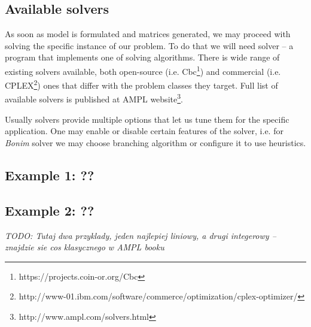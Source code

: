 \subsection{Available solvers}

As soon as model is formulated and matrices generated, we may proceed with solving the specific instance of our problem. To do that we will need solver -- a program that implements one of solving algorithms. There is wide range of existing solvers available, both open-source (i.e. Cbc\footnote{https://projects.coin-or.org/Cbc}) and commercial (i.e. CPLEX\footnote{http://www-01.ibm.com/software/commerce/optimization/cplex-optimizer/}) ones that differ with the problem classes they target. Full list of available solvers is published at AMPL website\footnote{http://www.ampl.com/solvers.html}.

Usually solvers provide multiple options that let us tune them for the specific application. One may enable or disable certain features of the solver, i.e. for \emph{Bonim} solver we may choose branching algorithm or configure it to use heuristics.

\subsection{Example 1: ??}
\subsection{Example 2: ??}

\emph{TODO: Tutaj dwa przyklady, jeden najlepiej liniowy, a drugi integerowy – znajdzie sie cos klasycznego w AMPL booku}